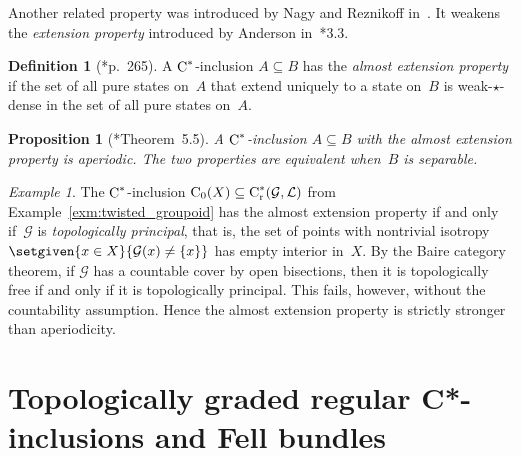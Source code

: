 \documentclass[a4paper]{amsart}
\theoremstyle{plain}
\newtheorem{proposition}[theorem]{Proposition}
\theoremstyle{definition}
\newtheorem{definition}[theorem]{Definition}
\theoremstyle{remark}
\newtheorem{example}[theorem]{Example}
\numberwithin{theorem}{section}
\numberwithin{equation}{section}
\newcommand*{\nb}{\nobreakdash}
\newcommand*{\red}{\mathrm{r}}%
\newcommand*{\Cst}{\textup C^*}%
\newcommand*{\Cont}{\textup C}%
\renewcommand*{\L}{\mathcal L}%
\newcommand*{\Gr}{\mathcal{G}}%
\begin{document}
Another related property was introduced by Nagy and Reznikoff
in~\cite{Nagy-Reznikoff:Pseudo-diagonals}.
It weakens the \emph{extension property} introduced by Anderson
in~\cite{Anderson:Extensions_states}*{3.3}.

\begin{definition}[\cite{Nagy-Reznikoff:Pseudo-diagonals}*{p.~265}]
  \label{def:almost_extension_property}
  A \(\Cst\)\nb-inclusion \(A\subseteq B\) has the \emph{almost
    extension property} if the set of all pure states on~\(A\) that
  extend uniquely to a state on~\(B\) is weak-\(\star\)-dense in the
  set of all pure states on~\(A\).
\end{definition}

\begin{proposition}[\cite{Kwasniewski-Meyer:Aperiodicity_pseudo_expectations}*{Theorem~5.5}]
  \label{prop:almost_extension_aperiodic}
  A \(\Cst\)\nb-inclusion \(A\subseteq B\)  with the almost extension
  property is aperiodic.
  The two properties are equivalent when~\(B\) is separable.
\end{proposition}

\begin{example}
  The \(\Cst\)\nb-inclusion \(\Cont_0(X)\subseteq \Cst_\red(\Gr, \L)\)
  from Example~\ref{exm:twisted_groupoid} has the almost extension
  property if and only if~\(\Gr\) is \emph{topologically principal},
  that is, the set of points with nontrivial isotropy \(\setgiven{x\in
    X}{\Gr(x)\neq \{x\}}\) has empty interior in~\(X\).
  By the Baire category theorem, if $\Gr$ has a countable
  cover by open bisections, then it is topologically free if and only if it is
  topologically principal.
  This fails, however, without the countability assumption.
  Hence the almost extension property is strictly stronger than
  aperiodicity.
\end{example}


\section{Topologically graded regular C*-inclusions and Fell bundles}
\label{sec:Topologically graded regular C*-inclusions}
\end{document}
